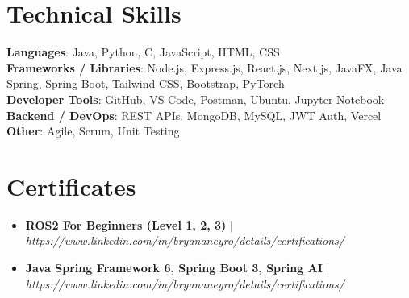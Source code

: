 \documentclass[letterpaper,11pt]{article}
\newcommand{\resumeItem}[1]{
  \item\small{
    {#1 \vspace{-2pt}}
  }
}
\newcommand{\resumeItemListStart}{\begin{itemize}}
\newcommand{\resumeItemListEnd}{\end{itemize}\vspace{-5pt}}
\begin{document}
\section{Technical Skills}
\begin{itemize}[leftmargin=0.15in, label={}]
  \small{\item{
    \textbf{Languages}{: Java, Python, C, JavaScript, HTML, CSS} \\
    \textbf{Frameworks / Libraries}{: Node.js, Express.js, React.js, Next.js, JavaFX, Java Spring, Spring Boot, Tailwind CSS, Bootstrap, PyTorch} \\
    \textbf{Developer Tools}{: GitHub, VS Code, Postman, Ubuntu, Jupyter Notebook} \\
    \textbf{Backend / DevOps}{: REST APIs, MongoDB, MySQL, JWT Auth, Vercel} \\
    \textbf{Other}{: Agile, Scrum, Unit Testing}
  }}
\end{itemize}

\section{Certificates}
\resumeItemListStart
  \resumeItem
  {\textbf{ROS2 For Beginners (Level 1, 2, 3) } $|$ \emph{ https://www.linkedin.com/in/bryananeyro/details/certifications/}}
  \resumeItem
  {\textbf{Java Spring Framework 6, Spring Boot 3, Spring AI } $|$ \emph{ https://www.linkedin.com/in/bryananeyro/details/certifications/}}
\resumeItemListEnd
\end{document}
